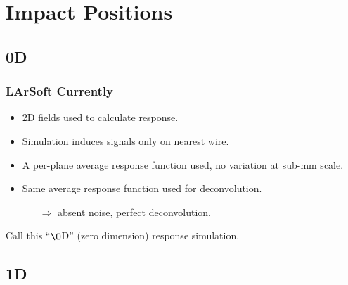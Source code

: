 \documentclass[xcolor=dvipsnames]{beamer}
\begin{document}




\section{Impact Positions}
\subsection{0D}

\begin{frame}
  \frametitle{LArSoft Currently}

  \begin{itemize}
  \item 2D fields used to calculate response.
  \item Simulation induces signals only on nearest wire.
  \item A per-plane average response function used, no variation at
    sub-mm scale.
  \item Same average response function used for deconvolution.
    \begin{itemize}
    \item[$\Rightarrow$] absent noise, perfect deconvolution.
    \end{itemize}
  \end{itemize}
  Call this ``$\O$D'' (zero dimension) response simulation.

\end{frame}

\subsection{1D}
\end{document}
